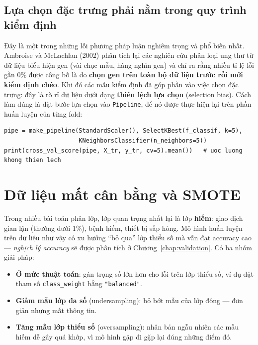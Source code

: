 \subsection{Lựa chọn đặc trưng phải nằm trong quy trình kiểm định}

Đây là một trong những lỗi phương pháp luận nghiêm trọng và phổ biến nhất. Ambroise và McLachlan (2002) phân tích lại các nghiên cứu phân loại ung thư từ dữ liệu biểu hiện gen (vài chục mẫu, hàng nghìn gen) và chỉ ra rằng nhiều tỉ lệ lỗi gần 0\% được công bố là do \textbf{chọn gen trên toàn bộ dữ liệu trước rồi mới kiểm định chéo}. Khi đó các mẫu kiểm định đã góp phần vào việc chọn đặc trưng: đây là rò rỉ dữ liệu dưới dạng \textbf{thiên lệch lựa chọn} (selection bias). Cách làm đúng là đặt bước lựa chọn vào \texttt{Pipeline}, để nó được thực hiện lại trên phần huấn luyện của từng fold:

\begin{lstlisting}[caption={Lựa chọn đặc trưng đúng cách: bên trong Pipeline}]
pipe = make_pipeline(StandardScaler(), SelectKBest(f_classif, k=5),
                     KNeighborsClassifier(n_neighbors=5))
print(cross_val_score(pipe, X_tr, y_tr, cv=5).mean())   # uoc luong khong thien lech
\end{lstlisting}

\section{Dữ liệu mất cân bằng và SMOTE}
\label{sec:smote}

Trong nhiều bài toán phân lớp, lớp quan trọng nhất lại là lớp \textbf{hiếm}: giao dịch gian lận (thường dưới 1\%), bệnh hiếm, thiết bị sắp hỏng. Mô hình huấn luyện trên dữ liệu như vậy có xu hướng ``bỏ qua'' lớp thiểu số mà vẫn đạt accuracy cao --- \textit{nghịch lý accuracy} sẽ được phân tích ở Chương~\ref{chap:validation}. Có ba nhóm giải pháp:
\begin{itemize}
    \item \textbf{Ở mức thuật toán}: gán trọng số lớn hơn cho lỗi trên lớp thiểu số, ví dụ đặt tham số \texttt{class\_weight} bằng \texttt{"balanced"}.
    \item \textbf{Giảm mẫu lớp đa số} (undersampling): bỏ bớt mẫu của lớp đông --- đơn giản nhưng mất thông tin.
    \item \textbf{Tăng mẫu lớp thiểu số} (oversampling): nhân bản ngẫu nhiên các mẫu hiếm dễ gây quá khớp, vì mô hình gặp đi gặp lại đúng những điểm đó.
\end{itemize}

